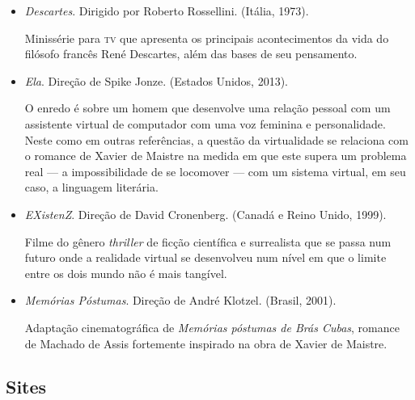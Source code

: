 \documentclass[12pt]{extarticle}
\begin{document}
\begin{itemize}

\item \textit{Descartes}. Dirigido por Roberto Rossellini. (Itália, 1973).

Minissérie para \textsc{tv} que apresenta os principais acontecimentos
da vida do filósofo francês René Descartes, além das bases de seu 
pensamento. 

\item \textit{Ela}. Direção de Spike Jonze. (Estados Unidos, 2013).

O enredo é sobre um homem que desenvolve uma relação pessoal com um 
assistente virtual de computador com uma voz feminina e personalidade. 
Neste como em outras referências, a questão da virtualidade se relaciona
com o romance de Xavier de Maistre na medida em que este supera um 
problema real --- a impossibilidade de se locomover --- com um sistema
virtual, em seu caso, a linguagem literária. 

\item \textit{EXistenZ}. Direção de David Cronenberg. (Canadá e Reino 
Unido, 1999).

Filme do gênero \emph{thriller} de ficção científica e surrealista que 
se passa num futuro onde a realidade virtual se desenvolveu num nível
em que o limite entre os dois mundo não é mais tangível. 

\item \textit{Memórias Póstumas}. Direção de André Klotzel. (Brasil, 2001).

Adaptação cinematográfica de \emph{Memórias póstumas de Brás Cubas},
romance de Machado de Assis fortemente inspirado na obra de Xavier de
Maistre.

\end{itemize}

\subsection{Sites}
\end{document}
